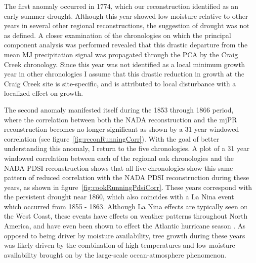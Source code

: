 The first anomaly occurred in 1774, which our reconstruction identified as an early summer drought. Although this year showed low moisture relative to other years in several other regional reconstructions, the suggestion of drought was not as defined. A closer examination of the chronologies on which the principal component analysis was performed revealed that this drastic departure from the mean MJ precipitation signal was propagated through the PCA by the Craig Creek chronology. Since this year was not identified as a local minimum growth year in other chronologies  I  assume that this drastic reduction in growth at the Craig Creek site is site-specific, and is attributed to local disturbance with a localized effect on growth. 

The second anomaly manifested itself during the 1853 through 1866 period, where the correlation between both the NADA reconstruction and the mjPR reconstruction becomes no longer significant as shown by a 31 year windowed correlation (see figure~\ref{fig:reconRunningCorr}). With the goal of better understanding this anomaly,  I  return to the five chronologies. A plot of a 31 year windowed correlation between each of the regional oak chronologies and the NADA PDSI reconstruction shows that all five chronologies show this same pattern of reduced correlation with the NADA PDSI reconstruction during these years, as shown in figure~\ref{fig:cookRunningPdsiCorr}. These years correspond with the persistent drought near 1860, which also coincides with a La Nina event which occurred from 1855 - 1863. Although La Nina effects are typically seen on the West Coast, these events have effects on weather patterns throughout North America, and have even been shown to effect the Atlantic hurricane season \cite{pielke1999nina}. As opposed to being driver by moisture availability, tree growth during these years was likely driven by the combination of high temperatures and low moisture availability brought on by the large-scale ocean-atmosphere phenomenon. %


